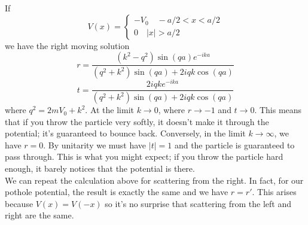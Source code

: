 \begin{example}
If
\[V(x) = \begin{cases} -V_0  \quad -a/2 < x < a/2 \\ 0 \quad |x| > a/2 \end{cases}\]
we have the right moving solution
\[r = \frac{(k^2-q^2)\sin(qa)e^{-ika}}{(q^2+k^2)\sin(qa) + 2iqk\cos(qa)}\]
\[t = \frac{2iqke^{-ika}}{(q^2+k^2)\sin(qa) + 2iqk\cos(qa)}\]
where $q^2 = 2mV_0 + k^2$. At the limit $k \to 0$, where $r \to -1$ and $t \to 0$. This means that if you throw the particle very softly, it doesn't make it through the potential; it's guaranteed to bounce back. Conversely, in the limit $k \to \infty$, we have $r = 0$. By unitarity we must have $|t| = 1$ and the particle is guaranteed to pass through. This is what you might expect; if you throw the particle hard enough, it barely notices that the potential is there.
\\
We can repeat the calculation above for scattering from the right. In fact, for our pothole potential, the result is exactly the same and we have $r = r'$. This arises because $V (x) = V (-x)$ so it's no surprise that scattering from the left and right are the same.
\end{example}

